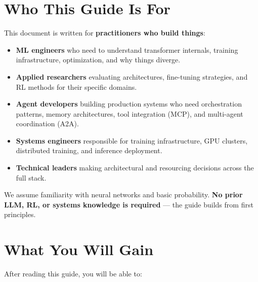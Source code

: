 \documentclass[11pt,a4paper,openany]{book}
\begin{document}
\section*{Who This Guide Is For}
\label{who-this-guide-is-for}

This document is written for \textbf{practitioners who build things}:

\begin{itemize}
  \item \textbf{ML engineers} who need to understand transformer internals, training infrastructure, optimization, and why things diverge.
  \item \textbf{Applied researchers} evaluating architectures, fine-tuning strategies, and RL methods for their specific domains.
  \item \textbf{Agent developers} building production systems who need orchestration patterns, memory architectures, tool integration (MCP), and multi-agent coordination (A2A).
  \item \textbf{Systems engineers} responsible for training infrastructure, GPU clusters, distributed training, and inference deployment.
  \item \textbf{Technical leaders} making architectural and resourcing decisions across the full stack.
\end{itemize}

We assume familiarity with neural networks and basic probability. \textbf{No prior LLM, RL, or systems knowledge is required} --- the guide builds from first principles.

\section*{What You Will Gain}
\label{what-you-will-gain}

After reading this guide, you will be able to:
\end{document}
